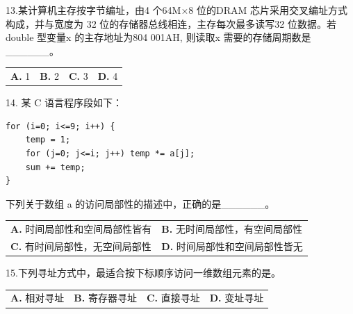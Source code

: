 \documentclass[UTF8,11pt]{ctexart}
\begin{document}
13.某计算机主存按字节编址，由4 个64M×8 位的DRAM 芯片采用交叉编址方式构成，并与宽度为 32 位的存储器总线相连，主存每次最多读写32 位数据。若double 型变量x 的主存地址为804 001AH, 则读取x 需要的存储周期数是\_\_\_\_\_\_。


\begin{center}\begin{tabular}{>{\raggedright\arraybackslash}p{\dimexpr(\linewidth-8\tabcolsep)/4\relax}>{\raggedright\arraybackslash}p{\dimexpr(\linewidth-8\tabcolsep)/4\relax}>{\raggedright\arraybackslash}p{\dimexpr(\linewidth-8\tabcolsep)/4\relax}>{\raggedright\arraybackslash}p{\dimexpr(\linewidth-8\tabcolsep)/4\relax}}
\textbf{A.} 1 & \textbf{B.} 2 & \textbf{C.} 3 & \textbf{D.} 4\\[.35em]\end{tabular}\end{center}

14. 某 C 语言程序段如下：


\begin{Verbatim}[breaklines,breakanywhere,fontsize=\small]
for (i=0; i<=9; i++) {
    temp = 1;
    for (j=0; j<=i; j++) temp *= a[j];
    sum += temp;
}
\end{Verbatim}

下列关于数组 a 的访问局部性的描述中，正确的是\_\_\_\_\_\_。


\begin{center}\begin{tabular}{>{\raggedright\arraybackslash}p{\dimexpr(\linewidth-4\tabcolsep)/2\relax}>{\raggedright\arraybackslash}p{\dimexpr(\linewidth-4\tabcolsep)/2\relax}}
\textbf{A.} 时间局部性和空间局部性皆有 & \textbf{B.} 无时间局部性，有空间局部性\\[.35em]
\textbf{C.} 有时间局部性，无空间局部性 & \textbf{D.} 时间局部性和空间局部性皆无\\[.35em]\end{tabular}\end{center}

15.下列寻址方式中，最适合按下标顺序访问一维数组元素的是。


\begin{center}\begin{tabular}{>{\raggedright\arraybackslash}p{\dimexpr(\linewidth-8\tabcolsep)/4\relax}>{\raggedright\arraybackslash}p{\dimexpr(\linewidth-8\tabcolsep)/4\relax}>{\raggedright\arraybackslash}p{\dimexpr(\linewidth-8\tabcolsep)/4\relax}>{\raggedright\arraybackslash}p{\dimexpr(\linewidth-8\tabcolsep)/4\relax}}
\textbf{A.} 相对寻址 & \textbf{B.} 寄存器寻址 & \textbf{C.} 直接寻址 & \textbf{D.} 变址寻址\\[.35em]\end{tabular}\end{center}
\end{document}
